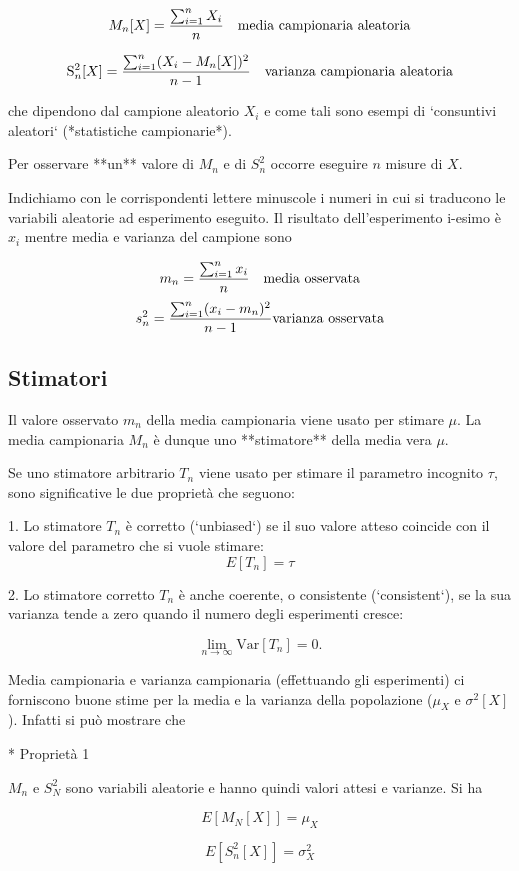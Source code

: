 \documentclass[onecolumn,12pt]{book}\usepackage[]{graphicx}\usepackage[]{color}
\begin{document}
\[ M_n[X]=\frac{\sum_{i=1}^n  X_i}{n}\quad \hbox{media campionaria aleatoria}\]

\[\mathrm{S}^2_n[X] = \frac{\sum_{i=1}^n  (X_i-M_n[X])^2}{n-1}\quad\hbox{varianza campionaria aleatoria}\]
 
che dipendono dal campione aleatorio $X_i$  e come tali sono esempi di `consuntivi aleatori` (*statistiche campionarie*).

Per osservare **un** valore di $M_n$ e di $S^2_n$ occorre eseguire $n$ misure di $X$.

Indichiamo con le corrispondenti lettere minuscole i numeri in cui si traducono le variabili aleatorie ad esperimento eseguito. Il risultato dell'esperimento i-esimo è  $x_i$ mentre media e varianza del campione   sono

 $$m_n=\frac{\sum_{i=1}^n x_i}{n}\quad\hbox{media osservata}$$
 $$s^2_n=\frac{\sum_{i=1}^n (x_i-m_n)^2}{n-1}\hbox{varianza osservata}$$
 
 
\subsection{Stimatori}

Il valore osservato $m_n$ della media campionaria viene usato per stimare $\mu$. La media campionaria $M_n$   è dunque uno **stimatore** della media vera $\mu$.


Se uno stimatore arbitrario $T_n$ viene usato per stimare il parametro incognito $\tau$, sono significative le due proprietà  che seguono:

1.  Lo stimatore $T_n$ è   corretto (`unbiased`) se il suo valore atteso coincide con il valore del parametro che si vuole stimare: $$E[T_n] = \tau$$

2. Lo stimatore corretto $T_n$ è  anche coerente, o consistente (`consistent`), se la sua
varianza tende a zero quando il numero degli esperimenti cresce: 

\[\lim_{n\to \infty}\mathrm{Var}[T_n] = 0.\]

Media campionaria e varianza campionaria (effettuando gli esperimenti) ci forniscono buone stime per la media e la varianza della popolazione ($\mu_X$ e $\sigma^2[X]$). Infatti si può  mostrare  che

* Proprietà  1

$M_n$ e $S^2_N$ sono variabili aleatorie e hanno quindi valori attesi e varianze. Si ha 

$$E[M_N[X]]= \mu_X$$

\[E[S^2_n[X]]=\sigma^2_X \]
\end{document}
